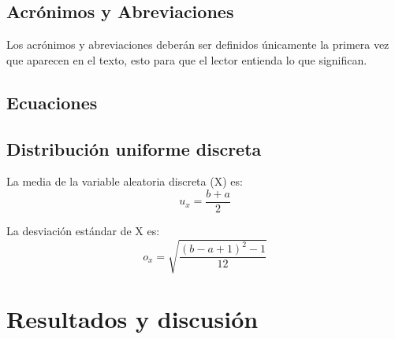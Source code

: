     \subsection{Acrónimos y Abreviaciones}
    
    Los acrónimos y abreviaciones deberán ser definidos únicamente la primera vez que aparecen en el texto, esto para que el lector entienda lo que significan.
    
    \subsection{Ecuaciones}
    
    
    
    
    \subsection{Distribución uniforme discreta}
    La media de la variable aleatoria discreta (X) es:
    \begin{equation}
         u_x=\dfrac{b+a}{2}
    \end{equation}
    
    La desviación estándar de X es:
    \begin{equation}
        o_x=\sqrt{\dfrac{(b-a+1)^2-1}{12}}
    \end{equation}
    
    
    \section{Resultados y discusión}
    
